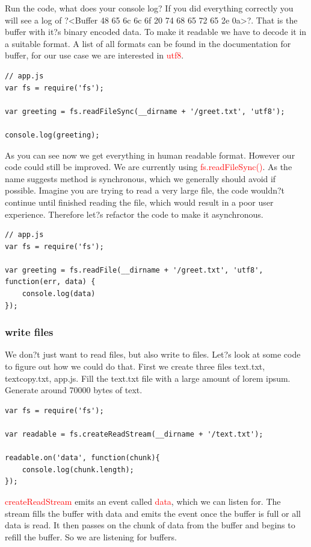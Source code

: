 \documentclass[a4paper]{article}
\begin{document}
Run the code, what does your console log? If you did everything correctly you will see a log of ?<Buffer 48 65 6c 6c 6f 20 74 68 65 72 65 2e 0a>?. That is the buffer with it?s binary encoded data. To make it readable we have to decode it in a suitable format. A list of all formats can be found in the documentation for buffer, for our use case we are interested in \textcolor{red}{utf8}.
\begin{lstlisting}
// app.js
var fs = require('fs');

var greeting = fs.readFileSync(__dirname + '/greet.txt', 'utf8');

console.log(greeting);
\end{lstlisting}
As you can see now we get everything in human readable format. However our code could still be improved. We are currently using \textcolor{red}{fs.readFileSync()}. As the name suggests method is synchronous, which we generally should avoid if possible. Imagine you are trying to read a very large file, the code wouldn?t continue until finished reading the file, which would result in a poor user experience. Therefore let?s refactor the code to make it asynchronous.
\begin{lstlisting}
// app.js
var fs = require('fs');

var greeting = fs.readFile(__dirname + '/greet.txt', 'utf8', function(err, data) {
    console.log(data)
});
\end{lstlisting}
\subsubsection{write files}
We don?t just want to read files, but also write to files. Let?s look at some code to figure out how we could do that. First we create three files text.txt, textcopy.txt, app.js. Fill the text.txt file with a large amount of lorem ipsum. Generate around 70000 bytes of text.
\begin{lstlisting}
var fs = require('fs');

var readable = fs.createReadStream(__dirname + '/text.txt');

readable.on('data', function(chunk){
    console.log(chunk.length);
});
\end{lstlisting}
\textcolor{red}{createReadStream} emits an event called \textcolor{red}{data}, which we can listen for. The stream fills the buffer with data and emits the event once the buffer is full or all data is read. It then passes on the chunk of data from the buffer and begins to refill the buffer. So we are listening for buffers. \\
\end{document}
